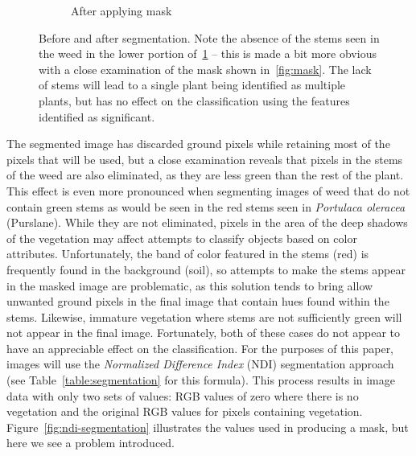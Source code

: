 \documentclass[letterpaper]{article}
\begin{document}
{{\begin{figure}[H]
\begin{subfigure}[h]{.30\textwidth}
	  \caption{After applying mask}
	  \label{fig:original-masked}
	\end{subfigure}
	\caption[Before and after segmentation]{Before and after segmentation. Note the absence of the stems seen in the weed in the lower portion of~\ref{fig:original-masked} -- this is made a bit more obvious with a close examination of the mask shown in~\ref{fig:mask}. The lack of stems will lead to a single plant being identified as multiple plants, but has no effect on the classification using the features identified as significant.}
	\label{fig:segmentation}
\end{figure}
The segmented image has discarded ground pixels while retaining most of the pixels that will be used, but a close examination reveals that pixels in the stems of the weed are also eliminated, as they are less green than the rest of the plant. This effect is even more pronounced when segmenting images of weed that do not contain green stems as would be seen in the red stems seen in \textit{Portulaca oleracea} (Purslane). While they are not eliminated, pixels in the area of the deep shadows of the vegetation may affect attempts to classify objects based on color attributes. Unfortunately, the band of color featured in the stems (red) is frequently found in the background (soil), so attempts to make the stems appear in the masked image are problematic, as this solution tends to bring allow unwanted ground pixels in the final image that contain hues found within the stems. Likewise, immature vegetation where stems are not sufficiently green will not appear in the final image. Fortunately, both of these cases do not appear to have an appreciable effect on the classification. For the purposes of this paper, images will use the \textit{Normalized Difference Index} (NDI) segmentation approach (see Table~\ref{table:segmentation} for this formula). This process results in image data with only two sets of values: RGB values of zero where there is no vegetation and the original RGB values for pixels containing vegetation. Figure~\ref{fig:ndi-segmentation} illustrates the values used in producing a mask, but here we see a problem introduced.

}}
\end{document}
